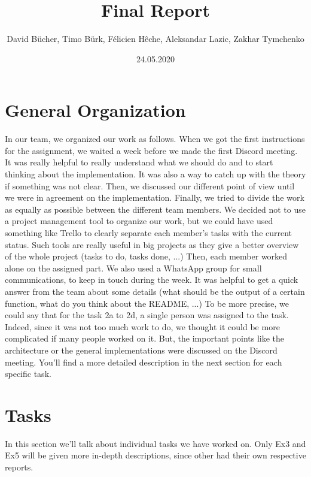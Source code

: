 \documentclass[12pt]{article}
\begin{document}
\title{Final Report}
\author{David Bücher, Timo Bürk, Félicien Hêche, Aleksandar Lazic, Zakhar Tymchenko }
\date{24.05.2020}
\maketitle


\section*{General Organization}
In our team, we organized our work as follows.
\newline When we got the first instructions for the assignment, we waited a week before we made the first Discord meeting. It was really helpful to really understand what we should do and to start thinking about the implementation. It was also a way to catch up with the theory if something was not clear. Then, we discussed our different point of view until we were in agreement on the implementation. Finally, we tried to divide the work as equally as possible between the different team members.
\newline We decided not to use a project management tool to organize our work, but we could have used something like Trello to clearly separate each member's tasks with the current status. Such tools are really useful in big projects as they give a better overview of the whole project (tasks to do, tasks done, ...)
\newline Then, each member worked alone on the assigned part. We also used a WhatsApp group for small communications, to keep in touch during the week. It was helpful to get a quick answer from the team about some details (what should be the output of a certain function, what do you think about the README, ...)
\newline  To be more precise, we could say that for the task 2a to 2d, a single person was assigned to the task. Indeed, since it was not too much work to do, we thought it could be more complicated if many people worked on it. But, the important points like the architecture or the general implementations were discussed on the Discord meeting. You'll find a more detailed description in the next section for each specific task.
\section*{Tasks}
In this section we'll talk about individual tasks we have worked on. Only Ex3 and Ex5 will be given more in-depth descriptions, since other had their own respective reports.
\end{document}
